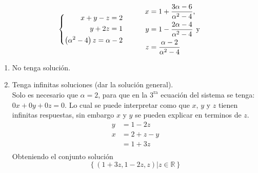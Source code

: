\documentclass{article}
\begin{document}
\begin{enumerate}
        \[
            \left\{
                \begin{aligned}
                    x + y - z = 2 \\
                    y + 2z = 1 \\
                    \left(\alpha^2 - 4\right)z = \alpha - 2
                \end{aligned}
            \right.
            \hspace{1cm}
            \begin{aligned}
                x &= 1 + \frac{3\alpha - 6}{\alpha^2 - 4} \text{,} \\
                y &= 1 - \frac{2\alpha - 4}{\alpha^2 - 4} \hspace{1ex} \text{y}  \\
                z &= \frac{\alpha - 2}{\alpha^2 - 4}
            \end{aligned}
        \]
        \begin{enumerate}[label=\listAlph]
            \item No tenga solución. \\

            \item Tenga infinitas soluciones (dar la solución general). \\
                Solo es necesario que \(\alpha = 2\), para que en la \(3^{\text{ra}}\) ecuación del sistema se tenga: \(0x + 0y + 0z = 0\).
                Lo cual se puede interpretar como  que \(x \text{, } y \text{ y } z\) tienen infinitas respuestas, 
                sin embargo \(x \text{ y } y\) se pueden explicar en terminos de \(z\).
                \[
                    \begin{aligned}
                        y &= 1 - 2z \\
                        x &= 2 + z - y \\
                        &= 1 + 3z \\
                    \end{aligned}
                \]
                Obteniendo el conjunto solución
                \[
                    \left\{\left(1 + 3z, 1 - 2z, z\right) | z \in \mathbb{R} \right\}
                \]


\end{enumerate}
\end{enumerate}
\end{document}
